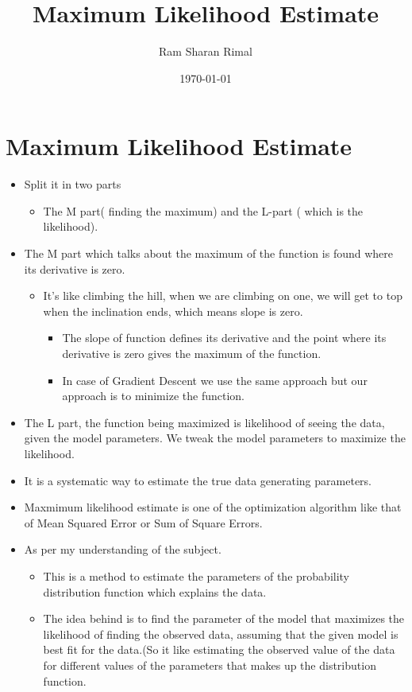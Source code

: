 \documentclass[11pt]{article}
\author{Ram Sharan Rimal  }
\date{\today}
\title{Maximum Likelihood Estimate}
\begin{document}
\maketitle
\tableofcontents


\section{Maximum Likelihood Estimate}
\label{sec:org74a0272}
\begin{itemize}
\item Split it in two parts
\begin{itemize}
\item The M part( finding the maximum) and the L-part ( which is the likelihood).
\end{itemize}
\item The M part which talks about the maximum of the function is found where its
derivative is zero.
\begin{itemize}
\item It's like climbing the hill, when we are climbing on one, we will get to
top when the inclination ends, which means slope is zero.
\begin{itemize}
\item The slope of function defines its derivative and the point where its
derivative is zero gives the maximum of the function.
\item In case of Gradient Descent we use the same approach but our approach is
to minimize the function.
\end{itemize}
\end{itemize}
\item The L part, the function being maximized is likelihood of seeing the data, given
the model parameters. We tweak the model parameters to maximize the likelihood.
\item It is a systematic way to estimate the true data generating parameters.
\end{itemize}


\begin{itemize}
\item Maxmimum likelihood estimate is one of the optimization algorithm like that
of Mean Squared Error or Sum of Square Errors.

\item As per my understanding of the subject.
\begin{itemize}
\item This is a method to estimate the parameters of the probability distribution
function which explains the data.
\item The idea behind is to find the parameter of the model that maximizes the
likelihood of finding the observed data, assuming that the given model is
best fit for the data.(So it like estimating the observed value of the data
for different values of the parameters that makes up the distribution function.
\end{itemize}
\end{itemize}
\end{document}
